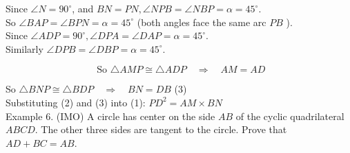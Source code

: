 \documentclass[10pt]{article}
\begin{document}
Since \(\angle N=90^{\circ}\), and \(B N=P N, \angle N P B=\angle N B P=\alpha=45^{\circ}\).\\
So \(\angle B A P=\angle B P N=\alpha=45^{\circ}\) (both angles face the same arc \(P B\) ).\\
Since \(\angle A D P=90^{\circ}, \angle D P A=\angle D A P=\alpha=45^{\circ}\).\\
Similarly \(\angle D P B=\angle D B P=\alpha=45^{\circ}\).

\[
\text { So } \triangle A M P \cong \triangle A D P \quad \Rightarrow \quad A M=A D
\]

So \(\triangle B N P \cong \triangle B D P \quad \Rightarrow \quad B N=D B\) (3)\\
Substituting (2) and (3) into (1): \(P D^{2}=A M \times B N\)\\
Example 6. (IMO) A circle has center on the side \(A B\) of the cyclic quadrilateral \(A B C D\). The other three sides are tangent to the circle. Prove that \(A D+B C=A B\).
\end{document}
